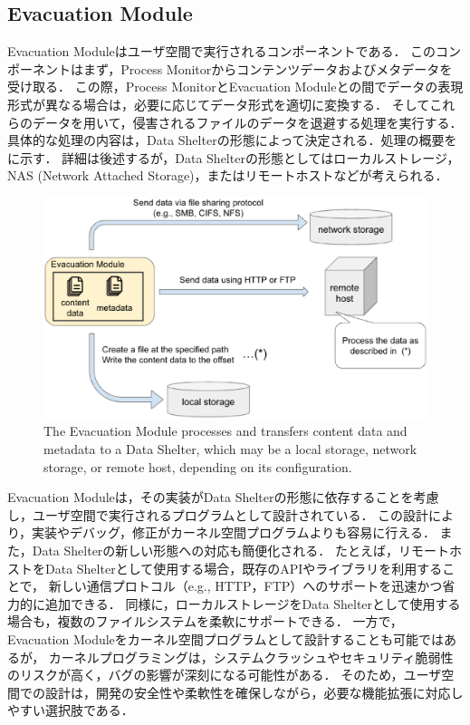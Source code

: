 \subsection{Evacuation Module}
Evacuation Moduleはユーザ空間で実行されるコンポーネントである．
このコンポーネントはまず，Process Monitorからコンテンツデータおよびメタデータを受け取る．
この際，Process MonitorとEvacuation Moduleとの間でデータの表現形式が異なる場合は，必要に応じてデータ形式を適切に変換する．
そしてこれらのデータを用いて，侵害されるファイルのデータを退避する処理を実行する．
具体的な処理の内容は，Data Shelterの形態によって決定される．処理の概要をに示す．
詳細は後述するが，Data Shelterの形態としてはローカルストレージ，NAS (Network Attached Storage)，またはリモートホストなどが考えられる．
\begin{figure}[t]
  \centering
  \includegraphics[width=0.9\columnwidth]{doc/img/how-to-evacuate.eps}
  \caption{The Evacuation Module processes and transfers content data and metadata to a Data Shelter,
    which may be a local storage, network storage, or remote host, depending on its configuration.}
  \label{fig:how-to-evacuate}
\end{figure}


Evacuation Moduleは，その実装がData Shelterの形態に依存することを考慮し，ユーザ空間で実行されるプログラムとして設計されている．
この設計により，実装やデバッグ，修正がカーネル空間プログラムよりも容易に行える．
また，Data Shelterの新しい形態への対応も簡便化される．
たとえば，リモートホストをData Shelterとして使用する場合，既存のAPIやライブラリを利用することで，
新しい通信プロトコル（e.g., HTTP，FTP）へのサポートを迅速かつ省力的に追加できる．
同様に，ローカルストレージをData Shelterとして使用する場合も，複数のファイルシステムを柔軟にサポートできる．
一方で，Evacuation Moduleをカーネル空間プログラムとして設計することも可能ではあるが，
カーネルプログラミングは，システムクラッシュやセキュリティ脆弱性のリスクが高く，バグの影響が深刻になる可能性がある．
そのため，ユーザ空間での設計は，開発の安全性や柔軟性を確保しながら，必要な機能拡張に対応しやすい選択肢である．

